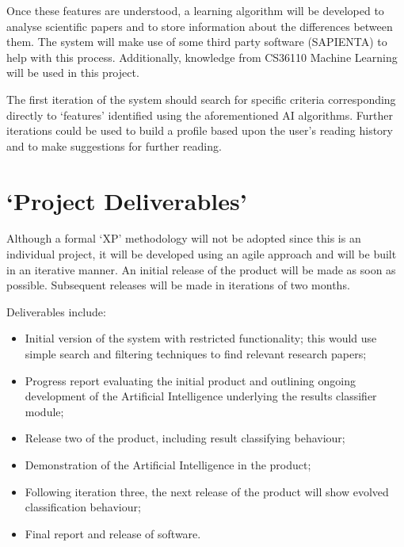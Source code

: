 \documentclass[12pt,a4paper]{article}
\begin{document}
Once these features are understood, a learning algorithm will be developed to
analyse scientific papers and to store information about the differences between 
them. The system will make use of some third party software (SAPIENTA) to help
with this process. Additionally, knowledge from CS36110 Machine Learning will be used in
this project.

The first iteration of the system should search for specific criteria corresponding directly to `features' identified using the aforementioned AI
algorithms. Further iterations could be used  to build a profile based upon the user's 
reading history and to make suggestions for further reading.

\section{`Project Deliverables'}

Although a formal `XP' methodology will not be adopted since this is an
individual project, it will be developed using an agile approach and will be built in an
iterative manner. An initial release of the product will be made as soon as
possible. Subsequent releases will be made in iterations of two months.

Deliverables include:
\begin{itemize}
    \item Initial version of the system with restricted functionality; this
    would  use simple search and filtering techniques to find relevant research
    papers;
    \item Progress report evaluating the initial product and outlining ongoing
    development of the Artificial Intelligence underlying the results
    classifier module;
    \item Release two of the product, including result classifying behaviour;
    \item Demonstration of the Artificial Intelligence in the product;
    \item Following iteration three, the next release of the product will show
    evolved classification behaviour;
    \item Final report and release of software.
\end{itemize}


\renewcommand{\refname}{Initial Bibliography} 

\nocite{*}

\end{document}
